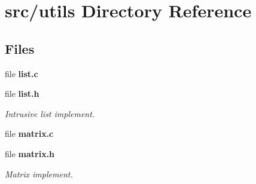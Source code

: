 \section{src/utils Directory Reference}
\label{dir_313caf1132e152dd9b58bea13a4052ca}
\subsection*{Files}
\begin{DoxyCompactItemize}
\item 
file \textbf{ list.\+c}
\item 
file \textbf{ list.\+h}
\begin{DoxyCompactList}\small\item\em Intrusive list implement. \end{DoxyCompactList}\item 
file \textbf{ matrix.\+c}
\item 
file \textbf{ matrix.\+h}
\begin{DoxyCompactList}\small\item\em Matrix implement. \end{DoxyCompactList}\end{DoxyCompactItemize}
